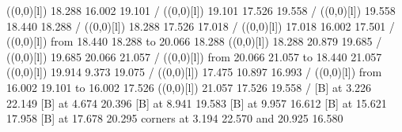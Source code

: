 {{}%
%
%
\linethickness=1pt
\setplotsymbol ({\makebox(0,0)[l]{\tencirc{}}})
{\color[rgb]{0,0,1} 18.288 16.002 19.101 /
}%
%
%
\linethickness=1pt
\setplotsymbol ({\makebox(0,0)[l]{\tencirc{}}})
{\color[rgb]{0,0,1} 19.101 17.526 19.558 /
}%
%
%
\linethickness=1pt
\setplotsymbol ({\makebox(0,0)[l]{\tencirc{}}})
{\color[rgb]{0,0,1} 19.558 18.440 18.288 /
}%
%
%
\linethickness=1pt
\setplotsymbol ({\makebox(0,0)[l]{\tencirc{}}})
{\color[rgb]{0,0,1} 18.288 17.526 17.018 /
}%
%
%
\linethickness=1pt
\setplotsymbol ({\makebox(0,0)[l]{\tencirc{}}})
{\color[rgb]{0,0,1} 17.018 16.002 17.501 /
}%
%
%
\linethickness=1pt
\setplotsymbol ({\makebox(0,0)[l]{\tencirc{}}})
{\color[rgb]{0,0,1}\putrule from 18.440 18.288 to 20.066 18.288
}%
%
%
\linethickness=1pt
\setplotsymbol ({\makebox(0,0)[l]{\tencirc{}}})
{\color[rgb]{0,0,1} 18.288 20.879 19.685 /
}%
%
%
\linethickness=1pt
\setplotsymbol ({\makebox(0,0)[l]{\tencirc{}}})
{\color[rgb]{0,0,1} 19.685 20.066 21.057 /
}%
%
%
\linethickness=1pt
\setplotsymbol ({\makebox(0,0)[l]{\tencirc{}}})
{\color[rgb]{0,0,1}\putrule from 20.066 21.057 to 18.440 21.057
}%
%
%
\linethickness=1pt
\setplotsymbol ({\makebox(0,0)[l]{\tencirc{}}})
{\color[rgb]{1,0,0} 19.914  9.373 19.075 /
}%
%
%
\linethickness=1pt
\setplotsymbol ({\makebox(0,0)[l]{\tencirc{}}})
{\color[rgb]{1,0,0} 17.475 10.897 16.993 /
}%
%
%
\linethickness=1pt
\setplotsymbol ({\makebox(0,0)[l]{\tencirc{}}})
{\color[rgb]{1,0,0}\putrule from 16.002 19.101 to 16.002 17.526
}%
%
%
\linethickness=1pt
\setplotsymbol ({\makebox(0,0)[l]{\tencirc{}}})
{\color[rgb]{1,0,0} 21.057 17.526 19.558 /
}%
%
%
 [B] at  3.226 22.149
%
%
 [B] at  4.674 20.396
%
%
 [B] at  8.941 19.583
%
%
 [B] at  9.957 16.612
%
%
 [B] at 15.621 17.958
%
%
 [B] at 17.678 20.295
\linethickness=0pt
\putrectangle corners at  3.194 22.570 and 20.925 16.580
\endpicture}
